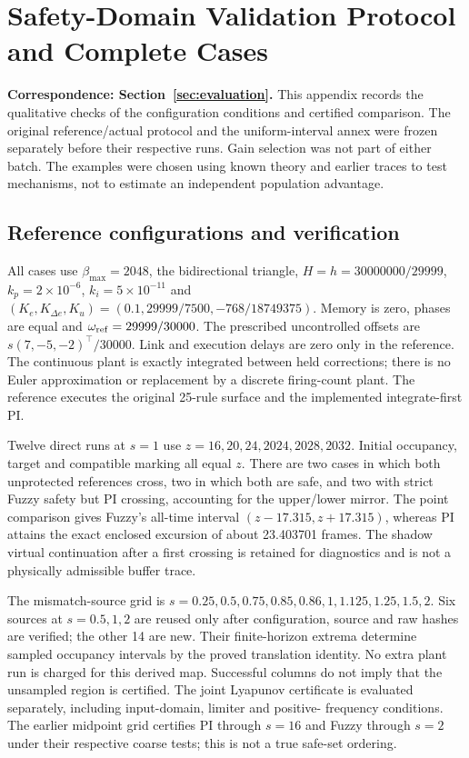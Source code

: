 \section{Safety-Domain Validation Protocol and Complete Cases}
\label{app:safety_validation}
\noindent\textbf{Correspondence: Section~\ref{sec:evaluation}.}
This appendix records the qualitative checks of the configuration
conditions and certified comparison. The original reference/actual
protocol and the uniform-interval annex were frozen separately before
their respective runs. Gain selection was not part of either batch.
The examples were chosen using known theory and earlier traces to
test mechanisms, not to estimate an independent population advantage.

\subsection{Reference configurations and verification}
All cases use $\beta_{\max}=2048$, the bidirectional triangle,
$H=h=30000000/29999$, $k_p=2\times10^{-6}$,
$k_i=5\times10^{-11}$ and
$(K_e,K_{\Delta e},K_u)=(0.1,29999/7500,-768/18749375)$.
Memory is zero, phases are equal and $\omega_{\rm ref}=29999/30000$.
The prescribed uncontrolled offsets are
$s(7,-5,-2)^\top/30000$. Link and execution delays are zero only in
the reference. The continuous plant is exactly integrated between
held corrections; there is no Euler approximation or replacement by
a discrete firing-count plant. The reference executes the original
25-rule surface and the implemented integrate-first PI.

Twelve direct runs at $s=1$ use $z=16,20,24,2024,2028,2032$.
Initial occupancy, target and compatible marking all equal $z$.
There are two cases in which both unprotected references cross,
two in which both are safe, and two with strict Fuzzy safety but
PI crossing, accounting for the upper/lower mirror.
The point comparison gives Fuzzy's all-time interval
$(z-17.315,z+17.315)$, whereas PI attains the exact enclosed
excursion of about 23.403701 frames. The shadow virtual continuation
after a first crossing is retained for diagnostics and is not a
physically admissible buffer trace.

The mismatch-source grid is
$s=0.25,\allowbreak0.5,\allowbreak0.75,\allowbreak0.85,\allowbreak0.86,\allowbreak1,\allowbreak1.125,\allowbreak1.25,\allowbreak1.5,\allowbreak2$.
Six sources at $s=0.5,1,2$ are reused only after configuration,
source and raw hashes are verified; the other 14 are new.
Their finite-horizon extrema determine sampled occupancy intervals
by the proved translation identity. No extra plant run is charged
for this derived map. Successful columns do not imply that the
unsampled region is certified. The joint Lyapunov certificate is
evaluated separately, including input-domain, limiter and positive-
frequency conditions. The earlier midpoint grid certifies PI through
$s=16$ and Fuzzy through $s=2$ under their respective coarse tests;
this is not a true safe-set ordering.

